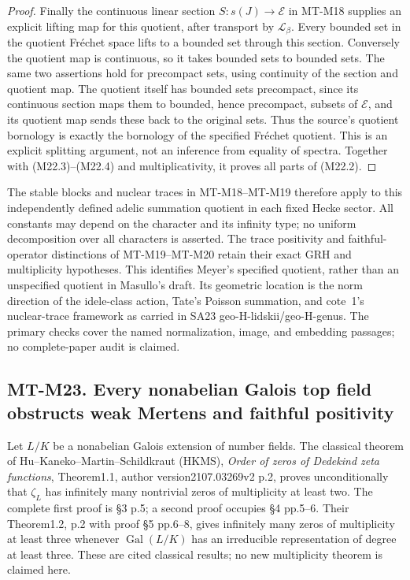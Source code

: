 \documentclass[11pt,a4paper]{article}
\begin{document}
\begin{proof}
Finally the continuous linear section
\(S:s(J)\to\mathcal E\) in MT-M18 supplies
an explicit lifting map for this quotient,
after transport by \(\mathcal L_\beta\).
Every bounded set in the quotient
Fr\'echet space lifts to a bounded set
through this section.  Conversely the
quotient map is continuous, so it takes
bounded sets to bounded sets.
The same two assertions hold for
precompact sets, using continuity of
the section and quotient map.
The quotient itself has bounded sets
precompact, since its continuous section
maps them to bounded, hence precompact,
subsets of \(\mathcal E\), and its
quotient map sends these back to the
original sets.
Thus the source's quotient bornology
is exactly the bornology of the specified
Fr\'echet quotient.  This is an explicit
splitting argument, not an inference
from equality of spectra.
Together with (M22.3)--(M22.4) and
multiplicativity, it proves all parts
of (M22.2).
\end{proof}

The stable blocks and nuclear traces in
MT-M18--MT-M19 therefore apply to this
independently defined adelic summation
quotient in each fixed Hecke sector.
All constants may depend on the character
and its infinity type; no uniform
decomposition over all characters is
asserted.  The trace positivity and
faithful-operator distinctions of
MT-M19--MT-M20 retain their exact GRH
and multiplicity hypotheses.
This identifies Meyer's specified
quotient, rather than an unspecified
quotient in Masullo's draft.
Its geometric location is the norm
direction of the idele-class action,
Tate's Poisson summation, and cote~1's
nuclear-trace framework as carried in
SA23 geo-H-lidskii/geo-H-genus.
The primary checks cover the named
normalization, image, and embedding
passages; no complete-paper audit
is claimed.


\subsection*{MT-M23. Every nonabelian Galois top field obstructs weak Mertens and faithful positivity}

Let $L/K$ be a nonabelian Galois extension of number fields. The
classical theorem of Hu--Kaneko--Martin--Schildkraut (HKMS),
\emph{Order of zeros of Dedekind zeta functions}, Theorem1.1,
author version2107.03269v2 p.2, proves unconditionally that
$\zeta_L$ has infinitely many nontrivial zeros of multiplicity
at least two. The complete first proof is \S3 p.5; a second
proof occupies \S4 pp.5--6. Their Theorem1.2, p.2 with proof
\S5 pp.6--8, gives infinitely many zeros of multiplicity at
least three whenever $\operatorname{Gal}(L/K)$ has an irreducible
representation of degree at least three. These are cited classical
results; no new multiplicity theorem is claimed here.
\end{document}
